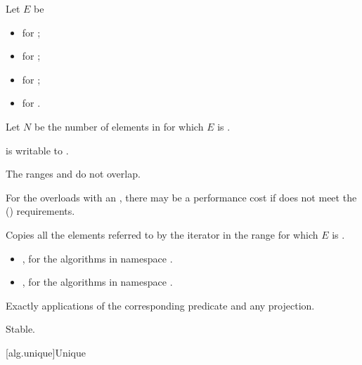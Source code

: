 \begin{itemdescr}
\pnum
Let $E$ be
\begin{itemize}
\item {} for ;
\item {} for ;
\item {} for ;
\item {} for .
\end{itemize}

\pnum
Let $N$ be the number of elements in 
for which $E$ is .

\pnum
\mandates
{} is writable to .

\pnum
\expects
The ranges  and 
do not overlap.
\begin{note}
For the overloads with an ,
there may be a performance cost
if  does not meet
the  () requirements.
\end{note}

\pnum
\effects
Copies all the elements referred to by the iterator 
in the range  for which $E$ is .

\pnum
\returns
\begin{itemize}
\item {}, for the algorithms in namespace .
\item {}, for the algorithms in namespace .
\end{itemize}

\pnum
\complexity
Exactly  applications
of the corresponding predicate and any projection.

\pnum
\remarks
Stable.
\end{itemdescr}

[alg.unique]{Unique}

